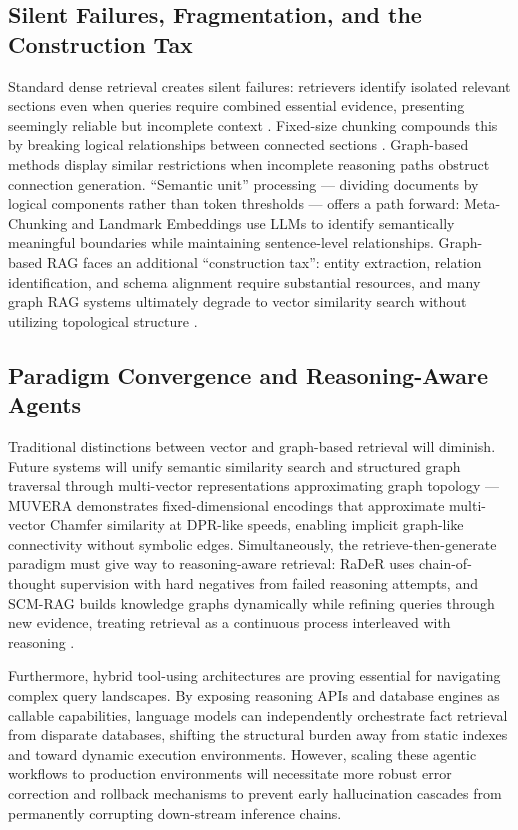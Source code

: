 \documentclass[runningheads]{llncs}
\begin{document}
\subsection{Silent Failures, Fragmentation, and the Construction Tax}

Standard dense retrieval creates silent failures: retrievers identify isolated relevant sections even when queries require combined essential evidence, presenting seemingly reliable but incomplete context \cite{9,10}. Fixed-size chunking compounds this by breaking logical relationships between connected sections \cite{11}. Graph-based methods display similar restrictions when incomplete reasoning paths obstruct connection generation. ``Semantic unit'' processing — dividing documents by logical components rather than token thresholds — offers a path forward: Meta-Chunking \cite{11} and Landmark Embeddings \cite{12} use LLMs to identify semantically meaningful boundaries while maintaining sentence-level relationships. Graph-based RAG faces an additional ``construction tax'': entity extraction, relation identification, and schema alignment require substantial resources, and many graph RAG systems ultimately degrade to vector similarity search without utilizing topological structure \cite{15,21}.

\subsection{Paradigm Convergence and Reasoning-Aware Agents}

Traditional distinctions between vector and graph-based retrieval will diminish. Future systems will unify semantic similarity search and structured graph traversal through multi-vector representations approximating graph topology — MUVERA \cite{10} demonstrates fixed-dimensional encodings that approximate multi-vector Chamfer similarity at DPR-like speeds, enabling implicit graph-like connectivity without symbolic edges. Simultaneously, the retrieve-then-generate paradigm must give way to reasoning-aware retrieval: RaDeR \cite{68} uses chain-of-thought supervision with hard negatives from failed reasoning attempts, and SCM-RAG \cite{78} builds knowledge graphs dynamically while refining queries through new evidence, treating retrieval as a continuous process interleaved with reasoning \cite{67}.

Furthermore, hybrid tool-using architectures \cite{69,87,88} are proving essential for navigating complex query landscapes. By exposing reasoning APIs and database engines as callable capabilities, language models can independently orchestrate fact retrieval from disparate databases, shifting the structural burden away from static indexes and toward dynamic execution environments. However, scaling these agentic workflows to production environments will necessitate more robust error correction and rollback mechanisms to prevent early hallucination cascades from permanently corrupting down-stream inference chains.
\end{document}

